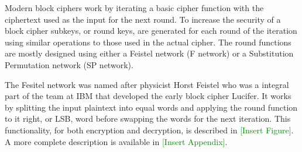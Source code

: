 \documentclass[12pt,twoside,a4paper]{report}
\begin{document}
    Modern block ciphers work by iterating a basic cipher function with the ciphertext used as the input for the next round\cite{Shannon1949}.
    To increase the security of a block cipher subkeys, or round keys, are generated for each round of the iteration using similar operations to those used in the actual cipher.
    The round functions are mostly designed using either a Feistel network\cite{Feistel1973} (F network) or a Substitution Permutation network (SP network)\cite{AlfredJ.Menezes1996}.
    
    
    The Fesitel network was named after physicist Horst Feistel who was a integral part of the team at IBM that developed the early block cipher Lucifer. It works by splitting the input plaintext into equal words and applying the round function to it right, or LSB, word before swapping the words for the next iteration. This functionality, for both encryption and decryption, is described in \textcolor{green}{[Insert Figure]}. A more complete description is available in \textcolor{green}{[Insert Appendix]}.
    
    
\end{document}
